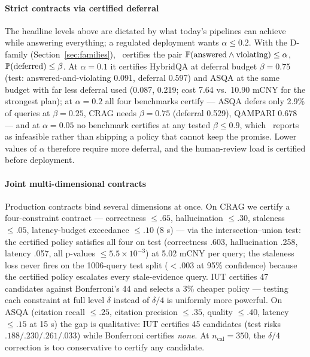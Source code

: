\paragraph{Strict contracts via certified deferral}
The headline levels above are dictated by what today's pipelines can
achieve while answering everything; a regulated deployment wants
$\alpha \le 0.2$. With the D-family (Section~\ref{sec:families}),
\system\ certifies the pair $\mathbb{P}(\text{answered} \wedge
\text{violating}) \le \alpha$, $\mathbb{P}(\text{deferred}) \le \beta$. At
$\alpha = 0.1$ it certifies HybridQA at deferral budget $\beta = 0.75$
(test: answered-and-violating 0.091, deferral 0.597) and ASQA at the
same budget with far less deferral used (0.087, 0.219; cost 7.64 vs.\
10.90 mCNY for the strongest plan); at $\alpha = 0.2$ all four
benchmarks certify --- ASQA defers only 2.9\% of queries at
$\beta = 0.25$, CRAG needs $\beta = 0.75$ (deferral 0.529), QAMPARI
0.678 --- and at $\alpha = 0.05$ no benchmark certifies at any tested
$\beta \le 0.9$, which \system\ reports as infeasible rather than
shipping a policy that cannot keep the promise. Lower values of
$\alpha$ therefore require more deferral, and the human-review load is
certified before deployment.

\paragraph{Joint multi-dimensional contracts}
Production contracts bind several dimensions at once. On CRAG we
certify a four-constraint contract --- correctness $\le .65$,
hallucination $\le .30$, staleness $\le .05$, latency-budget
exceedance $\le .10$ (8 s) --- via the intersection--union test:
the certified policy satisfies all four on test (correctness .603,
hallucination .258, latency .057, all p-values
$\le 5.5\times 10^{-3}$) at 5.02
mCNY per query; the staleness loss never fires on the 1006-query test
split ($<.003$ at 95\% confidence) because the certified policy
escalates every stale-evidence query. IUT certifies 47 candidates against Bonferroni's 44
and selects a 3\% cheaper policy --- testing each constraint at full
level $\delta$ instead of $\delta/4$ is uniformly more powerful. On
ASQA (citation recall $\le .25$, citation precision $\le .35$, quality
$\le .40$, latency $\le .15$ at 15 s) the gap is qualitative:
IUT certifies 45 candidates (test risks $.188/.230/.261/.033$) while
Bonferroni certifies \emph{none}. At $n_{\mathrm{cal}} = 350$, the
$\delta/4$ correction is too conservative to certify any candidate.

